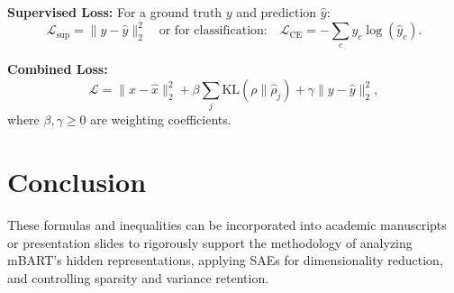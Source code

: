 \documentclass[11pt,a4paper]{article}
\begin{document}
\textbf{Supervised Loss:} For a ground truth $y$ and prediction $\hat{y}$:
\[
\mathcal{L}_{\text{sup}} = \| y - \hat{y} \|_2^2 \quad \text{or for classification:} \quad \mathcal{L}_{\text{CE}} = -\sum_c y_c \log(\hat{y}_c).
\]

\textbf{Combined Loss:}
\[
\mathcal{L} = \| x - \hat{x} \|_2^2 + \beta \sum_j \text{KL}(\rho \| \hat{\rho}_j) + \gamma \| y - \hat{y} \|_2^2,
\]
where $\beta, \gamma \geq 0$ are weighting coefficients.

\section{Conclusion}
These formulas and inequalities can be incorporated into academic manuscripts or presentation slides to rigorously support the methodology of analyzing mBART’s hidden representations, applying SAEs for dimensionality reduction, and controlling sparsity and variance retention.
\end{document}

